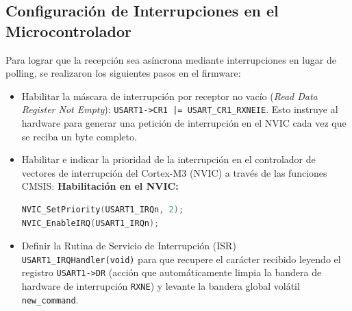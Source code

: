 \documentclass{plantilla}
\begin{document}
\subsection{Configuración de Interrupciones en el Microcontrolador}
Para lograr que la recepción sea asíncrona mediante interrupciones en lugar de polling, se realizaron los siguientes pasos en el firmware:
\begin{itemize}
    \item Habilitar la máscara de interrupción por receptor no vacío (\textit{Read Data Register Not Empty}): \texttt{USART1-\textgreater{}CR1 |= USART\_CR1\_RXNEIE}. Esto instruye al hardware para generar una petición de interrupción en el NVIC cada vez que se reciba un byte completo.
    \item Habilitar e indicar la prioridad de la interrupción en el controlador de vectores de interrupción del Cortex-M3 (NVIC) a través de las funciones CMSIS:
    \noindent\textbf{Habilitación en el NVIC:}
    \begin{lstlisting}[language=C]
NVIC_SetPriority(USART1_IRQn, 2);
NVIC_EnableIRQ(USART1_IRQn);
    \end{lstlisting}
    \item Definir la Rutina de Servicio de Interrupción (ISR) \texttt{USART1\_IRQHandler(void)} para que recupere el carácter recibido leyendo el registro \texttt{USART1-\textgreater{}DR} (acción que automáticamente limpia la bandera de hardware de interrupción \texttt{RXNE}) y levante la bandera global volátil \texttt{new\_command}.
\end{itemize}
\end{document}
